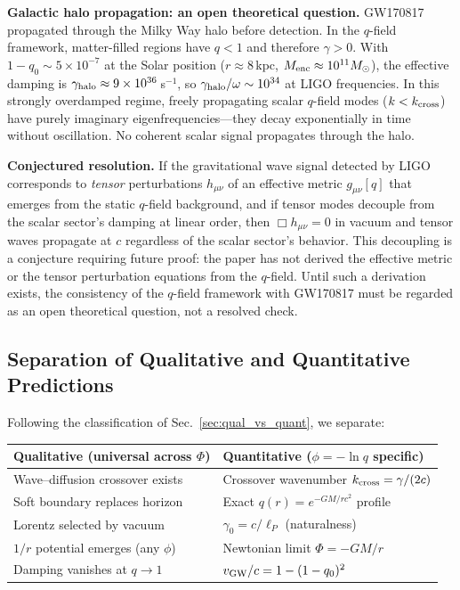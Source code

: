 \documentclass[aps,prd,twocolumn,showpacs,superscriptaddress,preprintnumbers]{revtex4-2}
\begin{document}
\textbf{Galactic halo propagation: an open theoretical question.}
GW170817 propagated through the Milky Way halo before detection.
In the $q$-field framework, matter-filled regions have $q<1$ and therefore $\gamma>0$.
With $1-q_0 \sim 5\times10^{-7}$ at the Solar position ($r\approx8$\,kpc, $M_{\rm enc}\approx10^{11}M_\odot$), the effective damping is $\gamma_{\rm halo} \approx 9\times10^{36}$\,s$^{-1}$, so $\gamma_{\rm halo}/\omega \sim 10^{34}$ at LIGO frequencies.
In this strongly overdamped regime, freely propagating scalar $q$-field modes ($k < k_{\rm cross}$) have purely imaginary eigenfrequencies---they decay exponentially in time without oscillation.
No coherent scalar signal propagates through the halo.

\textbf{Conjectured resolution.}
If the gravitational wave signal detected by LIGO corresponds to \emph{tensor} perturbations $h_{\mu\nu}$ of an effective metric $g_{\mu\nu}[q]$ that emerges from the static $q$-field background, and if tensor modes decouple from the scalar sector's damping at linear order, then $\Box h_{\mu\nu}=0$ in vacuum and tensor waves propagate at $c$ regardless of the scalar sector's behavior.
This decoupling is a conjecture requiring future proof: the paper has not derived the effective metric or the tensor perturbation equations from the $q$-field.
Until such a derivation exists, the consistency of the $q$-field framework with GW170817 must be regarded as an open theoretical question, not a resolved check.

\subsection{Separation of Qualitative and Quantitative Predictions}

Following the classification of Sec.~\ref{sec:qual_vs_quant}, we separate:

\begin{center}
\begin{tabular}{p{}p{}}
\toprule
\textbf{Qualitative (universal across $\Phi$)} & \textbf{Quantitative ($\phi=-\ln q$ specific)} \\
\midrule
Wave--diffusion crossover exists & Crossover wavenumber $k_{\rm cross}=\gamma/(2c)$ \\
Soft boundary replaces horizon & Exact $q(r)=e^{-GM/rc^2}$ profile \\
Lorentz selected by vacuum & $\gamma_0=c/\ell_P$ (naturalness) \\
$1/r$ potential emerges (any $\phi$) & Newtonian limit $\Phi=-GM/r$ \\
Damping vanishes at $q\to1$ & $v_{\rm GW}/c = 1-(1-q_0)^2$ \\
\bottomrule
\end{tabular}
\end{center}
\end{document}
